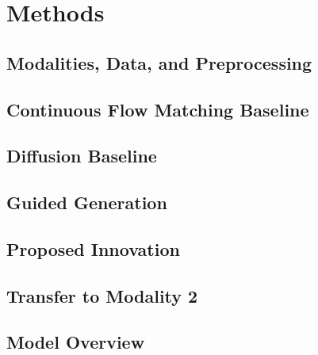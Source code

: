 \section{Methods}
\label{sec:methods}

\subsection{Modalities, Data, and Preprocessing}
\label{sec:data}
\todo{}

\subsection{Continuous Flow Matching Baseline}
\label{sec:fm}
\todo{}

\subsection{Diffusion Baseline}
\label{sec:diff}
\todo{}

\subsection{Guided Generation}
\label{sec:guidance}
\todo{}

\subsection{Proposed Innovation}
\label{sec:innovation}
\todo{}

\subsection{Transfer to Modality 2}
\label{sec:transfer}
\todo{}

\subsection{Model Overview}
\label{sec:overview}
\begin{figure}[t]
  \centering
  \caption{}
  \label{fig:overview}
\end{figure}

